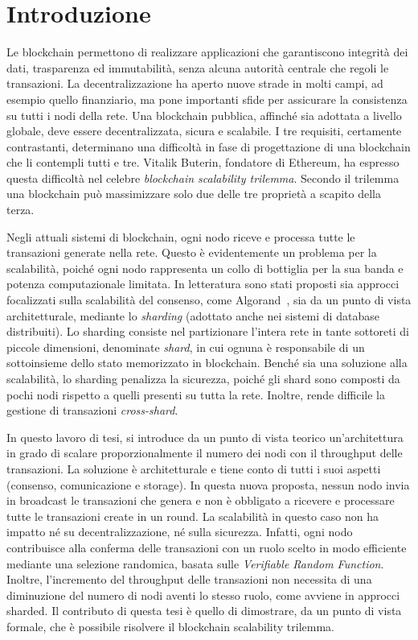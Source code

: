 \chapter{Introduzione}

Le blockchain permettono di realizzare applicazioni che garantiscono integrità dei dati, trasparenza ed immutabilità, senza alcuna autorità centrale che regoli le transazioni. La decentralizzazione ha aperto nuove strade in molti campi, ad esempio quello finanziario, ma pone importanti sfide per assicurare la consistenza su tutti i nodi della rete. Una blockchain pubblica, affinché sia adottata a livello globale, deve essere decentralizzata, sicura e scalabile. I tre requisiti, certamente contrastanti, determinano una difficoltà in fase di progettazione di una blockchain che li contempli tutti e tre. Vitalik Buterin, fondatore di Ethereum, ha espresso questa difficoltà nel celebre \textit{blockchain scalability trilemma}. Secondo il trilemma una blockchain può massimizzare solo due delle tre proprietà a scapito della terza.

Negli attuali sistemi di blockchain, ogni nodo riceve e processa tutte le transazioni generate nella rete. Questo è evidentemente un problema per la scalabilità, poiché ogni nodo rappresenta un collo di bottiglia per la sua banda e potenza computazionale limitata. In letteratura sono stati proposti sia approcci focalizzati sulla scalabilità del consenso, come Algorand~\cite{gilad2017algorand}, sia da un punto di vista architetturale, mediante lo \textit{sharding} (adottato anche nei sistemi di database distribuiti). Lo sharding consiste nel partizionare l'intera rete in tante sottoreti di piccole dimensioni, denominate \textit{shard}, in cui ognuna è responsabile di un sottoinsieme dello stato memorizzato in blockchain. Benché sia una soluzione alla scalabilità, lo sharding penalizza la sicurezza, poiché gli shard sono composti da pochi nodi rispetto a quelli presenti su tutta la rete. Inoltre, rende difficile la gestione di transazioni \textit{cross-shard}.

In questo lavoro di tesi, si introduce da un punto di vista teorico un'architettura in grado di scalare proporzionalmente il numero dei nodi con il throughput delle transazioni. La soluzione è architetturale e tiene conto di tutti i suoi aspetti (consenso, comunicazione e storage). In questa nuova proposta, nessun nodo invia in broadcast le transazioni che genera e non è obbligato a ricevere e processare tutte le transazioni create in un round. La scalabilità in questo caso non ha impatto né su decentralizzazione, né sulla sicurezza. Infatti, ogni nodo contribuisce alla conferma delle transazioni con un ruolo scelto in modo efficiente mediante una selezione randomica, basata sulle \textit{Verifiable Random Function}. Inoltre, l'incremento del throughput delle transazioni non necessita di una diminuzione del numero di nodi aventi lo stesso ruolo, come avviene in approcci sharded. Il contributo di questa tesi è quello di dimostrare, da un punto di vista formale, che è possibile risolvere il blockchain scalability trilemma.

